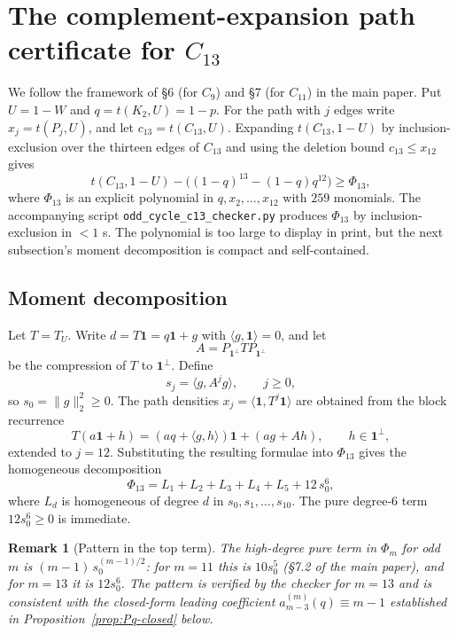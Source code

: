 \documentclass[11pt]{article}
\newtheorem{remark}[theorem]{Remark}
\newcommand{\one}{\mathbf 1}
\begin{document}
\section{The complement-expansion path certificate for $C_{13}$}\label{sec:path}

We follow the framework of \S 6 (for $C_9$) and \S 7 (for $C_{11}$) in the main paper.  Put $U = 1 - W$ and $q = t(K_2, U) = 1 - p$.  For the path with $j$ edges write $x_j = t(P_j, U)$, and let $c_{13} = t(C_{13}, U)$.  Expanding $t(C_{13}, 1-U)$ by inclusion-exclusion over the thirteen edges of $C_{13}$ and using the deletion bound $c_{13} \le x_{12}$ gives
\begin{equation}\label{eq:Phi13-defn}
        t(C_{13}, 1-U) - \bigl((1-q)^{13} - (1-q) q^{12}\bigr) \ge \Phi_{13},
\end{equation}
where $\Phi_{13}$ is an explicit polynomial in $q, x_2, \ldots, x_{12}$ with $259$ monomials.  The accompanying script \texttt{odd\_cycle\_c13\_checker.py} produces $\Phi_{13}$ by inclusion-exclusion in $<1$ s.  The polynomial is too large to display in print, but the next subsection's moment decomposition is compact and self-contained.

\subsection{Moment decomposition}

Let $T = T_U$.  Write $d = T\one = q\one + g$ with $\langle g, \one \rangle = 0$, and let
\[
        A = P_{\one^\perp} T P_{\one^\perp}
\]
be the compression of $T$ to $\one^\perp$.  Define
\[
        s_j = \langle g, A^j g \rangle, \qquad j \ge 0,
\]
so $s_0 = \|g\|_2^2 \ge 0$.  The path densities $x_j = \langle \one, T^j \one\rangle$ are obtained from the block recurrence
\[
        T(a\one + h) = (aq + \langle g, h\rangle)\one + (ag + Ah), \qquad h \in \one^\perp,
\]
extended to $j = 12$.  Substituting the resulting formulae into $\Phi_{13}$ gives the homogeneous decomposition
\begin{equation}\label{eq:Phi13-decomp}
        \Phi_{13} = L_1 + L_2 + L_3 + L_4 + L_5 + 12\, s_0^6,
\end{equation}
where $L_d$ is homogeneous of degree $d$ in $s_0, s_1, \ldots, s_{10}$.  The pure degree-$6$ term $12 s_0^6 \ge 0$ is immediate.

\begin{remark}[Pattern in the top term]
The high-degree pure term in $\Phi_m$ for odd $m$ is $(m-1)\, s_0^{(m-1)/2}$: for $m = 11$ this is $10 s_0^5$ (\S 7.2 of the main paper), and for $m = 13$ it is $12 s_0^6$.  The pattern is verified by the checker for $m = 13$ and is consistent with the closed-form leading coefficient $a_{m-3}^{(m)}(q) \equiv m - 1$ established in Proposition~\ref{prop:Pq-closed} below.
\end{remark}
\end{document}
